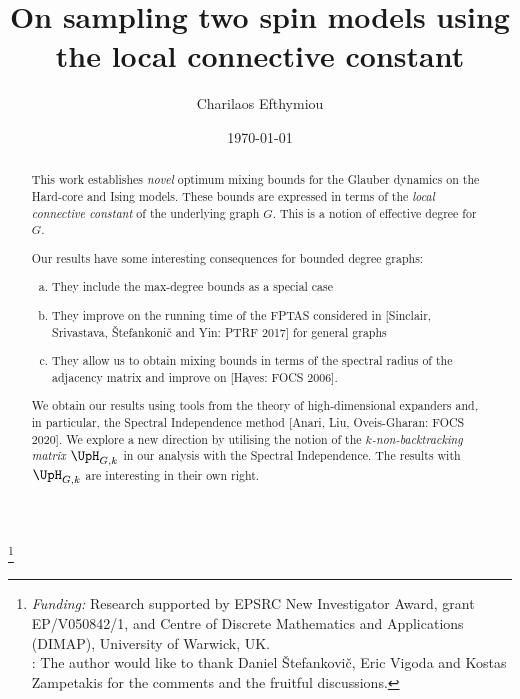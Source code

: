 \documentclass[11pt,reqno]{amsart}
\date{\today}
\numberwithin{equation}{section}
\newcommand{\bluepigment}[1]{{\color{blue(pigment)}#1}}
\newcommand{\cadmiumgreen}[1]{{\color{cadmiumgreen}#1}}
\newcommand{\NBMatrix}{\cadmiumgreen{\UpH}_{G,\kk}}
\renewcommand{\bluepigment}[1]{#1}
\renewcommand{\cadmiumgreen}[1]{#1}
\newcommand{\kk}{\bluepigment{k}}
\renewcommand{\kk}{k}
\begin{document}
 
\title{On sampling two spin models using \\the local connective constant}
%
\author{
Charilaos Efthymiou
}
 
\thanks{ 
{\em Funding:} Research supported by EPSRC New Investigator Award, grant EP/V050842/1, and 
Centre of Discrete Mathematics and Applications (DIMAP), University of Warwick, UK. \\ 
%
\hspace*{.725cm}{\em Acknowledgement}: The author would like to thank Daniel \v Stefankovi\v c, Eric Vigoda and Kostas Zampetakis for the comments and the fruitful discussions. 
}
\address{Charilaos Efthymiou, {\tt charilaos.efthymiou@warwick.ac.uk}, University of Warwick, Coventry, CV4 7AL, UK.}


\maketitle

\thispagestyle{empty}


\begin{abstract}
This work establishes {\em novel} optimum mixing bounds for the Glauber dynamics  on the Hard-core and 
Ising models.  These bounds are expressed in terms of the {\em local connective constant}  of  the underlying 
graph $G$. This is a notion of effective degree for $G$.


Our results have some interesting consequences for bounded degree graphs:
% 
\begin{enumerate}[(a)]
\item They include the max-degree bounds as a special case
\item They improve on the running time of the FPTAS considered in [Sinclair, Srivastava, \v Stefankoni\v c and Yin: PTRF 2017] for general graphs
\item They allow us to obtain  mixing bounds in terms of the spectral radius of the adjacency matrix and
 improve on  [Hayes: FOCS 2006].
\end{enumerate}
%
We obtain our results  using  tools from the theory of high-dimensional expanders and, in particular, the 
Spectral Independence method  [Anari, Liu, Oveis-Gharan: FOCS 2020]. 
%
We explore a new direction by utilising  the notion of the  {\em $k$-non-backtracking matrix}  $\NBMatrix$ in our analysis with 
the Spectral Independence.  
The results with $\NBMatrix$ are interesting in their own right. 
\end{abstract}
 
\end{document}
